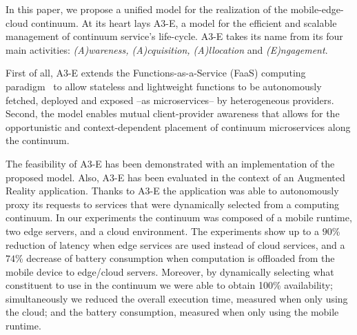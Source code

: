 In this paper, we propose a unified model for the realization of the mobile-edge-cloud continuum. At its heart lays A3-E, a model for the efficient and scalable management of continuum service's life-cycle. A3-E takes its name from its four main activities: \textit{(A)wareness, (A)cquisition, (A)llocation} and \textit{(E)ngagement}. 

First of all, A3-E extends the Functions-as-a-Service (FaaS) computing paradigm~\cite{Hendrickson:2016,baldini2017serverless,GarrigaMendonca2017} to allow stateless and lightweight functions to be autonomously fetched, deployed and exposed --as microservices-- by heterogeneous providers. Second, the model enables mutual client-provider awareness that allows for the opportunistic and context-dependent placement of continuum microservices along the continuum. 

The feasibility of A3-E has been demonstrated with an implementation of the proposed model. Also, A3-E has been evaluated in the context of an Augmented Reality application. Thanks to A3-E the application was able to autonomously proxy its requests to services that were dynamically selected from a computing continuum. In our experiments the continuum was composed of a mobile runtime, two edge servers, and a cloud environment. The experiments show up to a $90$\% reduction of latency when edge services are used instead of cloud services, and a $74$\% decrease of battery consumption when computation is offloaded from the mobile device to edge/cloud servers. Moreover, by dynamically selecting what constituent to use in the continuum we were able to obtain 100\% availability; simultaneously we reduced the overall execution time, measured when only using the cloud; and the battery consumption, measured when only using the mobile runtime.




